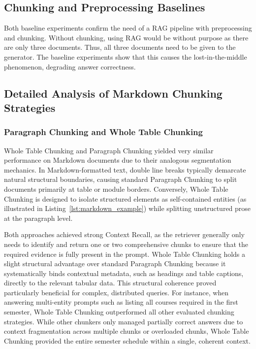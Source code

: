 \documentclass[12pt]{article} %
\begin{document}
\subsection{Chunking and Preprocessing Baselines}
Both baseline experiments confirm the need of a RAG pipeline with preprocessing and chunking. Without chunking, using RAG would be without purpose as there are only three documents. Thus, all three documents need to be given to the generator. The baseline experiments show that this causes the lost-in-the-middle phenomenon, degrading answer correctness.
\subsection{Detailed Analysis of Markdown Chunking Strategies}
\subsubsection{Paragraph Chunking and Whole Table Chunking}
Whole Table Chunking and Paragraph Chunking yielded very similar performance on Markdown documents due to their analogous segmentation mechanics. In Markdown-formatted text, double line breaks typically demarcate natural structural boundaries, causing standard Paragraph Chunking to split documents primarily at table or module borders. Conversely, Whole Table Chunking is designed to isolate structured elements as self-contained entities (as illustrated in Listing~\ref{lst:markdown_example}) while splitting unstructured prose at the paragraph level.

Both approaches achieved strong Context Recall, as the retriever generally only needs to identify and return one or two comprehensive chunks to ensure that the required evidence is fully present in the prompt. Whole Table Chunking holds a slight structural advantage over standard Paragraph Chunking because it systematically binds contextual metadata, such as headings and table captions, directly to the relevant tabular data. This structural coherence proved particularly beneficial for complex, distributed queries. For instance, when answering multi-entity prompts such as listing all courses required in the first semester, Whole Table Chunking outperformed all other evaluated chunking strategies. While other chunkers only managed partially correct answers due to context fragmentation across multiple chunks or overloaded chunks, Whole Table Chunking provided the entire semester schedule within a single, coherent context.
\end{document}
